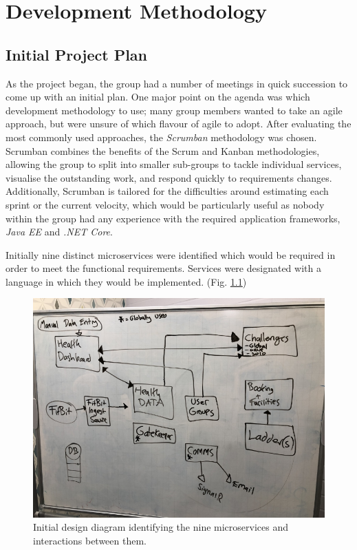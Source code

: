 \chapter{Development Methodology}

\section{Initial Project Plan}
As the project began, the group had a number of meetings in quick succession to come up with an initial plan. One major point on the agenda was which development methodology to use; many group members wanted to take an agile approach, but were unsure of which flavour of agile to adopt. After evaluating the most commonly used approaches, the \textit{Scrumban}\cite{scrumban} methodology was chosen. Scrumban combines the benefits of the Scrum and Kanban methodologies, allowing the group to split into smaller sub-groups to tackle individual services, visualise the outstanding work, and respond quickly to requirements changes. Additionally, Scrumban is tailored for the difficulties around estimating each sprint or the current velocity, which would be particularly useful as nobody within the group had any experience with the required application frameworks, \textit{Java EE} and \textit{.NET Core}.

Initially nine distinct microservices were identified which would be required in order to meet the functional requirements. Services were designated with a language in which they would be implemented. (Fig. \ref{fig:initial_spec_chart})

\begin{figure}[H]
    \centering
    \includegraphics[width=\textwidth]{Images/Initial_Spec_Chart.jpg}
    \caption{Initial design diagram identifying the nine microservices and interactions between them.}
    \label{fig:initial_spec_chart}
\end{figure}

